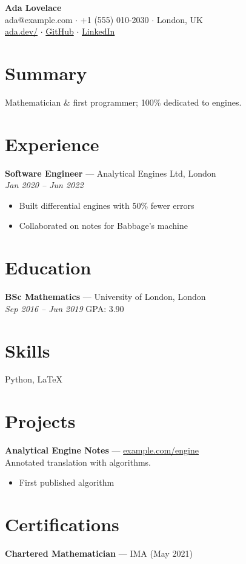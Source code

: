 \documentclass[11pt,a4paper]{article}
\begin{document}
\begin{center}
  {\LARGE\textbf{Ada Lovelace}}\\[0.4em]
ada@example.com $\cdot$ +1 (555) 010-2030 $\cdot$ London, UK\\[0.2em]
\href{https://ada.dev/}{ada.dev/} $\cdot$ \href{https://github.com/ada}{GitHub} $\cdot$ \href{https://linkedin.com/in/ada}{LinkedIn}\end{center}

\section*{Summary}
Mathematician \& first programmer; 100\% dedicated to engines.

\section*{Experience}
\textbf{Software Engineer} --- Analytical Engines Ltd, London\\
\textit{Jan 2020 -- Jun 2022}
\begin{itemize}
  \item Built differential engines with 50\% fewer errors
  \item Collaborated on notes for Babbage's machine
\end{itemize}


\section*{Education}
\textbf{BSc Mathematics} --- University of London, London\\
\textit{Sep 2016 -- Jun 2019} \quad GPA: 3.90

\section*{Skills}
Python, LaTeX

\section*{Projects}
\textbf{Analytical Engine Notes} --- \href{https://example.com/engine}{example.com/engine}\\
Annotated translation with algorithms.
\begin{itemize}
  \item First published algorithm
\end{itemize}


\section*{Certifications}
\textbf{Chartered Mathematician} --- IMA (May 2021)
\end{document}
